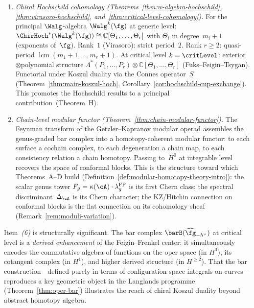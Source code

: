 \begin{enumerate}[label=\emph{(\arabic*)}]
\item \emph{Chiral Hochschild cohomology
  (Theorems~\ref{thm:w-algebra-hochschild},
  \ref{thm:virasoro-hochschild},
  and~\ref{thm:critical-level-cohomology}).}
  For the principal $\Walg$-algebra $\Walg^k(\fg)$ at generic level:
  $\ChirHoch^*(\Walg^k(\fg)) \cong \mathbb{C}[\Theta_1, \ldots, \Theta_r]$
  with $\Theta_i$ in degree~$m_i + 1$ (exponents of~$\fg$).
  Rank~$1$ (Virasoro): strict period~$2$.
  Rank $r \geq 2$: quasi-period $\operatorname{lcm}(m_1+1, \ldots, m_r+1)$.
  At critical level $k = \critLevel$:
  exterior$\otimes$polynomial structure
  $\Lambda^*(P_1, \ldots, P_r) \otimes \mathbb{C}[\Theta_1, \ldots, \Theta_r]$
  (Fuks--Feigin--Tsygan).
  Functorial under Koszul duality via the Connes
  operator~$S$ (Theorem~\ref{thm:main-koszul-hoch},
  Corollary~\ref{cor:hochschild-cup-exchange}).
  This promotes the Hochschild results to a
  principal contribution~(Theorem~H).

\item \emph{Chain-level modular functor
  (Theorem~\ref{thm:chain-modular-functor}).}
  The Feynman transform of the Getzler--Kapranov modular operad
  assembles the genus-graded bar complex into a homotopy-coherent
  modular functor: to each surface a cochain complex, to each
  degeneration a chain map, to each consistency relation a chain
  homotopy.  Passing to~$H^0$ at integrable level recovers the
  space of conformal blocks.  This is the structure toward which
  Theorems~A--D build
  (Definition~\ref{def:modular-homotopy-theory-intro}):
  the scalar genus tower
  $F_g = \kappa(\cA) \cdot \lambda_g^{\mathrm{FP}}$
  is its first Chern class; the spectral discriminant~$\Delta_\cA$
  is its Chern character; the KZ/Hitchin connection on conformal
  blocks is the flat connection on its cohomology sheaf
  (Remark~\ref{rem:moduli-variation}).

\end{enumerate}

\begin{remark}%
\label{rem:oper-langlands-concordance}
%
%
Item~\emph{(6)} is structurally significant.  The bar complex
$\barB(\widehat{\fg}_{-h^\vee})$ at critical level is a
\emph{derived enhancement} of the Feigin--Frenkel center: it
simultaneously encodes the commutative algebra of functions on
the oper space (in $H^0$), its cotangent complex (in $H^1$),
and higher derived structure (in $H^{\geq 2}$).  That the
bar construction---defined purely in terms of configuration
space integrals on curves---reproduces a key geometric
object in the Langlands programme
(Theorem~\ref{thm:oper-bar}) illustrates the reach of
chiral Koszul duality beyond abstract homotopy algebra.
\end{remark}

